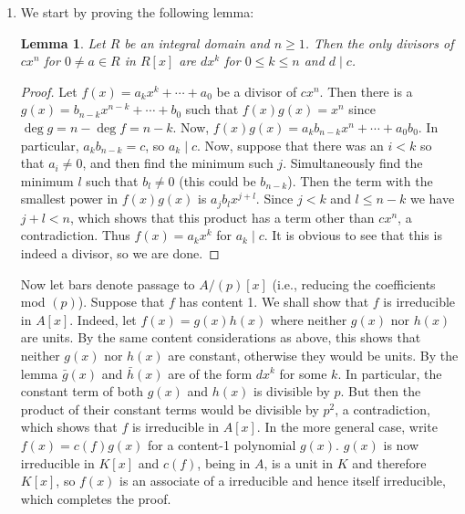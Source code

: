 \documentclass[12pt]{article}
\newtheorem{lemma}{Lemma}
\theoremstyle{definitionstyle}
\begin{document}
\begin{enumerate}[leftmargin=\labelsep]
		\item We start by proving the following lemma:
		
		\begin{lemma}
			Let $R$ be an integral domain and $n \geq 1$. Then the only divisors of $cx^n$ for $0 \neq a \in R$ in $R[x]$ are $dx^k$ for $0 \leq k \leq n$ and $d \mid c$.
		\end{lemma}
	
		\begin{proof}
			Let $f(x) = a_kx^k + \cdots + a_0$ be a divisor of $cx^n$. Then there is a $g(x) = b_{n-k}x^{n-k} + \cdots + b_0$ such that $f(x)g(x) = x^n$ since $\deg g = n - \deg f = n-k$. Now, $f(x)g(x) = a_kb_{n-k}x^n + \cdots + a_0b_0$. In particular, $a_kb_{n-k} = c$, so $a_k \mid c$. Now, suppose that there was an $i < k$ so that $a_i \neq 0$, and then find the minimum such $j$. Simultaneously find the minimum $l$ such that $b_l \neq 0$ (this could be $b_{n-k}$). Then the term with the smallest power in $f(x)g(x)$ is $a_jb_lx^{j+l}$. Since $j < k$ and $l \leq n-k$ we have $j+l < n$, which shows that this product has a term other than $cx^n$, a contradiction. Thus $f(x) = a_kx^k$ for $a_k \mid c$. It is obvious to see that this is indeed a divisor, so we are done.
		\end{proof}
	
		Now let bars denote passage to $A/(p)[x]$ (i.e., reducing the coefficients mod $(p)$). Suppose that $f$ has content 1. We shall show that $f$ is irreducible in $A[x]$. Indeed, let $f(x) = g(x)h(x)$ where neither $g(x)$ nor $h(x)$ are units. By the same content considerations as above, this shows that neither $g(x)$ nor $h(x)$ are constant, otherwise they would be units. By the lemma $\bar g(x)$ and $\bar h(x)$ are of the form $dx^k$ for some $k$. In particular, the constant term of both $g(x)$ and $h(x)$ is divisible by $p$. But then the product of their constant terms would be divisible by $p^2$, a contradiction, which shows that $f$ is irreducible in $A[x]$. In the more general case, write $f(x) = c(f)g(x)$ for a content-1 polynomial $g(x)$. $g(x)$ is now irreducible in $K[x]$ and $c(f)$, being in $A$, is a unit in $K$ and therefore $K[x]$, so $f(x)$ is an associate of a irreducible and hence itself irreducible, which completes the proof.
		

\end{enumerate}
\end{document}

